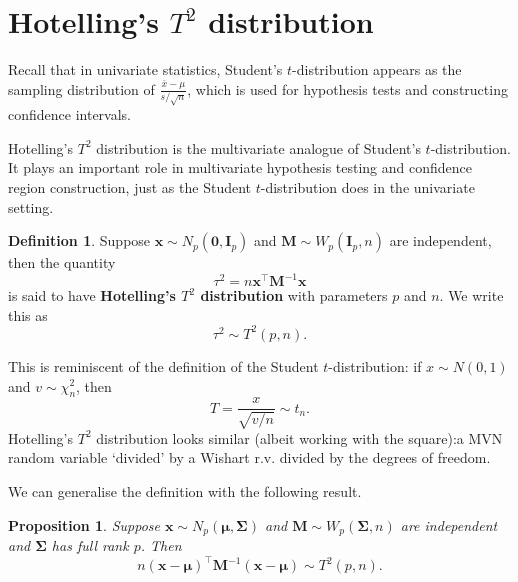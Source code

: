 \documentclass[
]{book}
\newtheorem{proposition}{Proposition}[chapter]
\theoremstyle{definition}
\newtheorem{definition}{Definition}[chapter]
\theoremstyle{definition}
\theoremstyle{definition}
\theoremstyle{definition}
\theoremstyle{remark}
\begin{document}
\section{\texorpdfstring{Hotelling's \(T^2\) distribution}{Hotelling's T\^{}2 distribution}}\label{hotellings-t2-distribution}

Recall that in univariate statistics, Student's \(t\)-distribution appears as the sampling distribution of \(\frac{\bar{x}-\mu}{s/\sqrt{n}}\), which is used for hypothesis tests and constructing confidence intervals.

Hotelling's \(T^2\) distribution is the multivariate analogue of Student's \(t\)-distribution. It plays an important role in multivariate hypothesis testing and confidence region construction, just as the Student \(t\)-distribution does in the univariate setting.

\begin{definition}
\protect\hypertarget{def:Hotelling}{}\label{def:Hotelling}Suppose \(\mathbf x\sim N_p({\boldsymbol 0},\mathbf I_p)\) and \(\mathbf M\sim W_p(\mathbf I_p,n)\) are independent, then the quantity
\[\tau ^2 = n \mathbf x^\top \mathbf M^{-1} \mathbf x\]
is said to have \textbf{Hotelling's \(T^2\) distribution} with parameters \(p\) and \(n\). We write this as \[\tau^2 \sim T^2(p,n).\]
\end{definition}

This is reminiscent of the definition of the Student \(t\)-distribution: if \(x \sim N(0,1)\) and \(v\sim \chi^2_n\), then
\[T = \frac{x}{\sqrt{v/n}} \sim t_n.\]
Hotelling's \(T^2\) distribution looks similar (albeit working with the square):a MVN random variable `divided' by a Wishart r.v. divided by the degrees of freedom.

We can generalise the definition with the following result.

\begin{proposition}
\protect\hypertarget{prp:six13}{}\label{prp:six13}Suppose \(\mathbf x\sim N_p({\boldsymbol{\mu}},\boldsymbol{\Sigma})\) and \(\mathbf M\sim W_p(\boldsymbol{\Sigma},n)\) are independent and
\(\boldsymbol{\Sigma}\) has full rank \(p\). Then
\[ n (\mathbf x-{\boldsymbol{\mu}})^\top \mathbf M^{-1} (\mathbf x-{\boldsymbol{\mu}}) \sim T^2(p,n). \]
\end{proposition}
\end{document}
